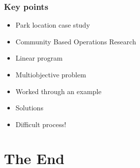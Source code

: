 \documentclass[10pt, compress]{beamer}
\begin{document}
\begin{frame}[fragile]
\frametitle{Key points}
\begin{itemize}[<+- | alert@+>]
\item Park location case study
\item Community Based Operations Research
\item Linear program
\item Multiobjective problem
\item Worked through an example
\item Solutions
\item Difficult process! 
\end{itemize}

\end{frame}

\section{The End}
\end{document}

